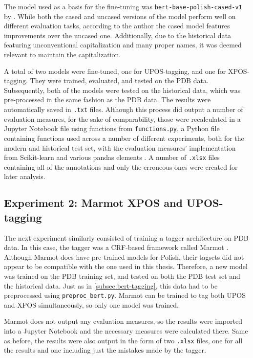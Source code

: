 The model used as a basis for the fine-tuning was \texttt{bert-base-polish-cased-v1} by \citet{kłeczek_2021}. While both the cased and uncased versions of the model perform well on different evaluation tasks, according to the author the cased model features improvements over the uncased one. Additionally, due to the historical data featuring unconventional capitalization and many proper names, it was deemed relevant to maintain the capitalization.

A total of two models were fine-tuned, one for UPOS-tagging, and one for XPOS-tagging. They were trained, evaluated, and tested on the PDB data. Subsequently, both of the models were tested on the historical data, which was pre-processed in the same fashion as the PDB data. The results were automatically saved in \texttt{.txt} files. Although this process did output a number of evaluation measures, for the sake of comparability, those were recalculated in a Jupyter Notebook file using functions from \texttt{functions.py}, a Python file containing functions used across a number of different experiments, both for the modern and historical test set, with the evaluation measures' implementation from Scikit-learn and various pandas elements \citep{scikit-learn, reback2020pandas, mckinney-proc-scipy-2010}. A number of \texttt{.xlsx} files containing all of the annotations and only the erroneous ones were created for later analysis. 

\subsection{Experiment 2: Marmot XPOS and UPOS-tagging}
\label{subsec:marmot-tagging}

The next experiment similarly consisted of training a tagger architecture on PDB data. In this case, the tagger was a CRF-based framework called Marmot \citep{mueller-etal-2013-efficient}. Although Marmot does have pre-trained models for Polish, their tagsets did not appear to be compatible with the one used in this thesis. Therefore, a new model was trained on the PDB training set, and tested on both the PDB test set and the historical data. Just as in \autoref{subsec:bert-tagging}, this data had to be preprocessed using \texttt{preproc\_bert.py}. Marmot can be trained to tag both UPOS and XPOS simultaneously, so only one model was trained. 

Marmot does not output any evaluation measures, so the results were imported into a Jupyter Notebook and the necessary measures were calculated there. Same as before, the results were also output in the form of two \texttt{.xlsx} files, one for all the results and one including just the mistakes made by the tagger.


